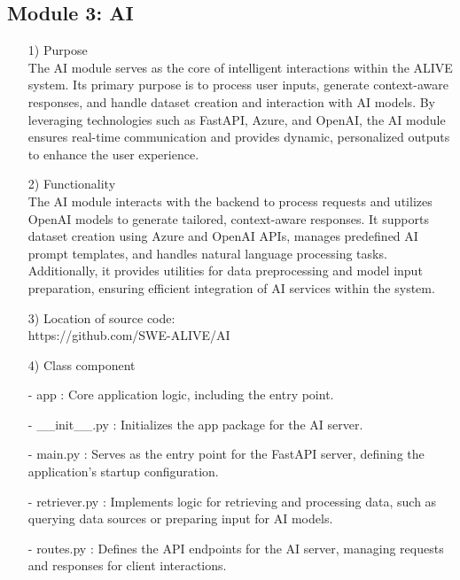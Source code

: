 \documentclass[conference]{IEEEtran}
\begin{document}
\subsection{Module 3: AI}
\begin{enumerate}
    \item[1)] Purpose\\
    The AI module serves as the core of intelligent interactions within the ALIVE system. Its primary purpose is to process user inputs, generate context-aware responses, and handle dataset creation and interaction with AI models. By leveraging technologies such as FastAPI, Azure, and OpenAI, the AI module ensures real-time communication and provides dynamic, personalized outputs to enhance the user experience. \\
    \item[2)] Functionality\\
    The AI module interacts with the backend to process requests and utilizes OpenAI models to generate tailored, context-aware responses. It supports dataset creation using Azure and OpenAI APIs, manages predefined AI prompt templates, and handles natural language processing tasks. Additionally, it provides utilities for data preprocessing and model input preparation, ensuring efficient integration of AI services within the system. \\
    
    \item[3)] Location of source code:\\ https://github.com/SWE-ALIVE/AI \\
    
    \item[4)] Class component
        
        \item[-] app : Core application logic, including the entry point.\\
        \item[-] \_\_init\_\_.py : Initializes the app package for the AI server.\\
        \item[-] main.py : Serves as the entry point for the FastAPI server, defining the application’s startup configuration.\\
        \item[-] retriever.py : Implements logic for retrieving and processing data, such as querying data sources or preparing input for AI models.\\
        \item[-] routes.py : Defines the API endpoints for the AI server, managing requests and responses for client interactions.\\
        

\end{enumerate}
\end{document}
